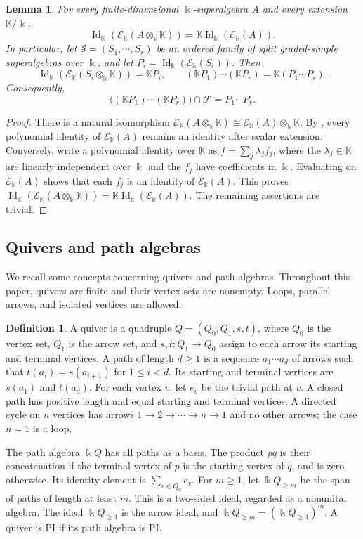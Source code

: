 \documentclass[11pt,reqno]{amsart}
\newcommand{\kk}{\Bbbk}
\newcommand{\KK}{\mathbb{K}}
\newcommand{\F}{\mathcal F}
\newcommand{\E}{\mathcal E}
\newcommand{\Id}{\operatorname{Id}}
\newtheorem{lemma}[theorem]{Lemma}
\theoremstyle{definition}
\newtheorem{definition}[theorem]{Definition}
\theoremstyle{remark}
\numberwithin{equation}{section}
\begin{document}
\begin{lemma}\label{lem:scalar-extension}
For every finite-dimensional $\kk$-superalgebra $A$ and every
extension $\KK/\kk$,
\[
\Id_{\KK}(\E_{\KK}(A\otimes_\kk \KK))=\KK\Id_\kk(\E_\kk(A)).
\]
In particular, let $\mathcal S=(S_1,\cdots,S_r)$ be an ordered
family of split graded-simple superalgebras over $\kk$, and let
$P_i=\Id_\kk(\E_\kk(S_i))$. Then
\[
\Id_{\KK}(\E_{\KK}(S_i\otimes_\kk \KK))={\KK}P_i,
\qquad
({\KK}P_1)\cdots({\KK}P_r)=\KK(P_1\cdots P_r).
\]
Consequently,
\[
\bigl(({\KK}P_1)\cdots({\KK}P_r)\bigr)\cap\F=P_1\cdots P_r.
\]
\end{lemma}

\begin{proof}
There is a natural isomorphism $
\E_{\KK}(A\otimes_\kk \KK)\cong\E_\kk(A)\otimes_\kk \KK$.
By \cite[Theorem~6.29]{Bresar2014}, every polynomial identity
of $\E_\kk(A)$ remains an identity after scalar extension.
Conversely, write a polynomial identity over $\KK$ as
$f=\sum_j\lambda_j f_j$, where the $\lambda_j\in \KK$ are
linearly independent over $\kk$ and the $f_j$ have
coefficients in $\kk$. Evaluating on $\E_\kk(A)$ shows
that each $f_j$ is an identity of $\E_\kk(A)$.
This proves
$
\Id_{\KK}(\E_{\KK}(A\otimes_\kk \KK))
=\KK\Id_\kk(\E_\kk(A))$.
The remaining assertions are trivial.
\end{proof}




\subsection{Quivers and path algebras}\label{subsec:quiver}

We  recall  some concepts concerning quivers and 
path algebras.
Throughout this paper, quivers are finite and their vertex sets
are nonempty. Loops, parallel arrows, and isolated vertices are allowed.

\begin{definition}\label{def:quiver-paths}
A quiver is a quadruple $Q=(Q_0,Q_1,s,t)$, where $Q_0$ is the
vertex set, $Q_1$ is the arrow set, and $s,t:Q_1\to Q_0$ assign
to each arrow its starting and terminal vertices.
A path of length $d\ge1$ is a sequence $a_1\cdots a_d$ of arrows
such that $t(a_i)=s(a_{i+1})$ for $1\le i<d$.
Its starting and terminal vertices are $s(a_1)$ and $t(a_d)$.
For each vertex $v$, let $e_v$ be the trivial path  at $v$.
A closed path has positive length and equal starting and terminal
vertices. A directed cycle on $n$ vertices has arrows
$1\to2\to\cdots\to n\to1$ and no other arrows; the case $n=1$
is a loop.

The path algebra $\kk Q$ has all paths as a basis.
The product $pq$ is their concatenation if the terminal vertex
of $p$ is the starting vertex of $q$, and is zero otherwise.
Its identity element is $\sum_{v\in Q_0}e_v$.
For $m\ge1$, let $\kk Q_{\ge m}$ be the span of paths of length
at least $m$. This is a two-sided ideal, regarded as a nonunital
algebra. The ideal $\kk Q_{\ge1}$ is the arrow ideal, and
$\kk Q_{\ge m}=(\kk Q_{\ge1})^m$.
A quiver is PI if its path algebra is PI.
\end{definition}
\end{document}

